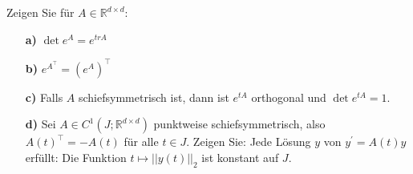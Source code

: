 \begin{exercise}
Zeigen Sie für $A \in \mathbb{R}^{d \times d}$:
\begin{itemize}
  \item [\textbf{a)}] $\det e^A = e^{tr A}$
  \item [\textbf{b)}] $e^{A^{\top}} = (e^A)^{\top}$
  \item [\textbf{c)}] Falls $A$ schiefsymmetrisch ist, dann ist $e^{tA}$ orthogonal
  und $\det e^{tA} = 1$.
  \item [\textbf{d)}] Sei $A \in C^1(J;\mathbb{R}^{d \times d})$ punktweise
  schiefsymmetrisch, also $A(t)^{\top} = -A(t)$ für alle $t \in J$.
  Zeigen Sie: Jede Lösung $y$ von $y^{\prime} = A(t)y$ erfüllt:
  Die Funktion $t \mapsto ||y(t)||_2$ ist konstant auf $J$.
\end{itemize}
\end{exercise}
